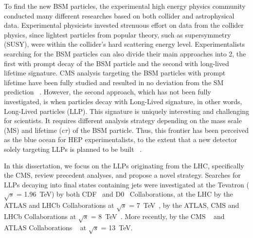 To find the new BSM particles, the experimental high energy physics community conducted many different researches based on both collider and astrophysical data.
Experimental physicists invested strenuous effort on data from the collider physics, since lightest particles from popular theory, such as supersymmetry (SUSY), were within the collider's hard scattering energy level.
Experimentalists searching for the BSM particles can also divide their main approaches into 2, the first with prompt decay of the BSM particle and the second with long-lived lifetime signature.
CMS analysis targeting the BSM particles with prompt lifetime have been fully studied and resulted in no deviation from the SM prediction ~\cite{SUSY}.
However, the second approach, which has not been fully investigated, is when particles decay with Long-Lived signature, in other words, Long-Lived particles (LLP).
This signature is uniquely interesting and challenging for scientists.
It requires different analysis strategy depending on the mass scale (MS) and lifetime (c$\tau$) of the BSM particle.
Thus, this frontier has been perceived as the blue ocean for HEP experimentalists, to the extent that a new detector solely targeting LLPs is planned to be built ~\cite{Barron:2022aac}.

In this dissertation, we focus on the LLPs originating from the LHC, specifically the CMS, review precedent analyses, and propose a novel strategy. 
Searches for LLPs decaying into final states containing jets were investigated
at the Tevatron ( $\sqrt{s}$ = 1.96~TeV) by both CDF~\cite{Aaltonen:2011rja} and D0~\cite{Abazov:2009ik} Collaborations,
at the LHC by the ATLAS and LHCb Collaborations at $\sqrt{s}$ = 7~TeV~\cite{ATLAS:2012av,Aaij:2014nma},
by the ATLAS, CMS and LHCb Collaborations at $\sqrt{s}$ = 8~TeV~\cite{Aad:2015uaa,Aad:2015rba,PhysRevD.91.012007,Aad:2015asa,Aaij:2017mic,Aaij:2016xmb,Aaij:2015ica}.
More recently, by the CMS ~\cite{Sirunyan:2017jdo,displacedvertices,displacedjets2016,delayedjets,emergingjets,CMS-PAS-EXO-19-021}
 and ATLAS Collaborations ~\cite{Aaboud:2018iil,Aaboud:2018jbr,Aaboud:2018arf,Aaboud:2018aqj,Aaboud:2018kbe,Aaboud:2019trc,Aaboud:2019opc,Aad:2019kiz,Aad:2019pfm,Aad:2019tcc,Aad:2019xav,Aad:2019tua} at $\sqrt{s}$ = 13~TeV. 

